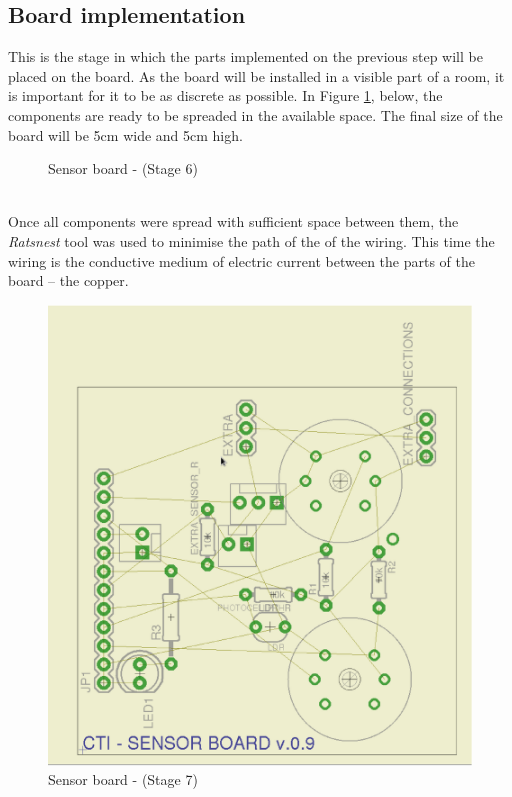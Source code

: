 \documentclass[12pt,a4paper,draft]{report}
\begin{document}
\subsection{Board implementation}
This is the stage in which the parts implemented on the previous step will be placed on the board.
As the board will be installed in a visible part of a room, it is important for it to be as discrete as possible.
In Figure \ref{Sensor-brd-s6}, below, the components are ready to be spreaded in the available space.
The final size of the board will be 5cm wide and 5cm high.
\ \\
\begin{figure}[H]
\centering
\caption{Sensor board -  (Stage 6)}
\label{Sensor-brd-s6}
\end{figure}
\ \\
Once all components were spread with sufficient space between them, the \textit{Ratsnest} tool was used to minimise the path of the of the wiring.
This time the wiring is the conductive medium of electric current between the parts of the board -- the copper.
\ \\
\begin{figure}[H]
\centering
\includegraphics*[scale=0.25]{sens_brd_s7}
\caption{Sensor board -  (Stage 7)}
\label{Sensor-brd-s7}
\end{figure}
\end{document}
